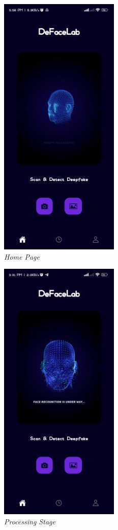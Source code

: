 \begin{figure}[ht]
    \centering
    \includegraphics[height =5in ]{img/landingpage.jpg}
    \caption{\textit{Home Page}}
\end{figure}

\begin{figure}[ht]
    \centering
    \includegraphics[height =5in ]{img/loading.jpg}
    \caption{\textit{Processing Stage}}
\end{figure}

